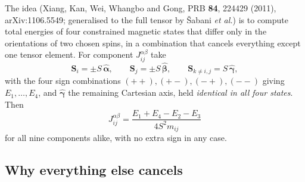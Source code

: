 \documentclass[11pt]{article}
\begin{document}
The idea (Xiang, Kan, Wei, Whangbo and Gong, PRB \textbf{84}, 224429 (2011),
arXiv:1106.5549; generalised to the full tensor by \v{S}abani \emph{et al.}) is
to compute total energies of four constrained magnetic states that differ only
in the orientations of two chosen spins, in a combination that cancels
everything except one tensor element. For component $J_{ij}^{\alpha\beta}$ take
\begin{equation}
  \mathbf S_i=\pm S\,\hat{\boldsymbol\alpha},\qquad
  \mathbf S_j=\pm S\,\hat{\boldsymbol\beta},\qquad
  \mathbf S_{k\neq i,j}=S\,\hat{\boldsymbol\gamma},
  \label{eq:four-states}
\end{equation}
with the four sign combinations $(+{+}),(+{-}),(-{+}),(-{-})$ giving
$E_1,\dots,E_4$, and $\hat{\boldsymbol\gamma}$ the remaining Cartesian axis,
held \emph{identical in all four states}. Then
\begin{equation}
  \boxed{\;J_{ij}^{\alpha\beta}=\frac{E_1+E_4-E_2-E_3}{4S^2m_{ij}}\;}
  \label{eq:four-state-formula}
\end{equation}
for all nine components alike, with no extra sign in any case.

\subsection{Why everything else cancels}
\end{document}
